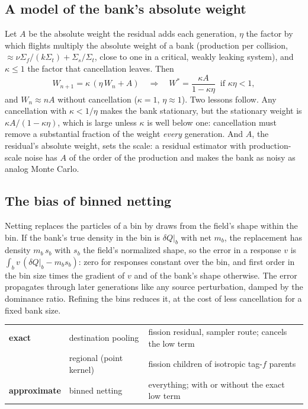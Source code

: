 \subsection{A model of the bank's absolute weight}\label{sec:wabs}

Let $A$ be the absolute weight the residual adds each generation, $\eta$ the factor by which flights
multiply the absolute weight of a bank (production per collision, $\approx\nu\Sigma_f/(k\Sigma_t)+
\Sigma_s/\Sigma_t$, close to one in a critical, weakly leaking system), and $\kappa\le1$ the factor
that cancellation leaves. Then
\begin{equation}
W_{n+1}=\kappa\,(\eta\,W_n+A)\quad\Longrightarrow\quad
W^\ast=\frac{\kappa A}{1-\kappa\eta}\ \text{ if } \kappa\eta<1,
\end{equation}
and $W_n\approx nA$ without cancellation ($\kappa=1$, $\eta\approx1$). Two lessons follow. Any
cancellation with $\kappa<1/\eta$ makes the bank stationary, but the stationary weight is
$\kappa A/(1-\kappa\eta)$, which is large unless $\kappa$ is well below one: cancellation must remove a
substantial fraction of the weight \emph{every} generation. And $A$, the residual's absolute weight,
sets the scale: a residual estimator with production-scale noise has $A$ of the order of the production
and makes the bank as noisy as analog Monte Carlo.

\subsection{The bias of binned netting}\label{sec:netting-bias}

Netting replaces the particles of a bin by draws from the field's shape within the bin. If the
bank's true density in the bin is $\delta Q|_b$ with net $m_b$, the replacement has density
$m_b\,s_b$ with $s_b$ the field's normalized shape, so the error in a response $v$ is
$\int_b v\,(\delta Q|_b-m_b s_b)$: zero for responses constant over the bin, and first order in the
bin size times the gradient of $v$ and of the bank's shape otherwise. The error propagates through
later generations like any source perturbation, damped by the dominance ratio. Refining the bins
reduces it, at the cost of less cancellation for a fixed bank size.

\begin{keybox}
\begin{tabular}{@{}lll@{}}
\textbf{exact} & destination pooling & fission residual, sampler route; cancels the low term\\
 & regional (point kernel) & fission children of isotropic tag-$f$ parents\\
\textbf{approximate} & binned netting & everything; with or without the exact low term\\
\end{tabular}
\end{keybox}

